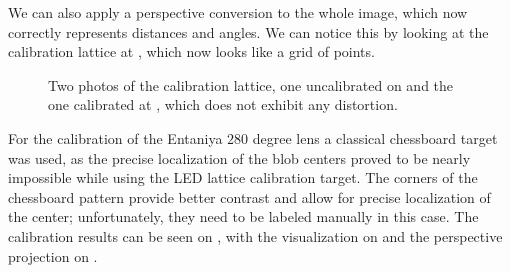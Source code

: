 We can also apply a perspective conversion to the whole image, which now correctly represents distances and angles. We can notice this by looking
at the calibration lattice at , which now looks like a grid of points.

\begin{figure}[H]
	\centering
	\caption{
		Two photos of the calibration lattice, one uncalibrated on  and the one calibrated at , which does not
		exhibit any distortion.
  }
	\label{fig:calib_c}
\end{figure}

For the calibration of the Entaniya $280$ degree lens a classical chessboard target was used, as the precise localization of the blob centers proved to be nearly impossible while using the \ac{LED} lattice calibration target. The corners of the chessboard pattern provide
better contrast and allow for precise localization of the center; unfortunately, they need to be labeled manually in this case.
The calibration results can be seen on , with the visualization on  and the perspective projection on
.


